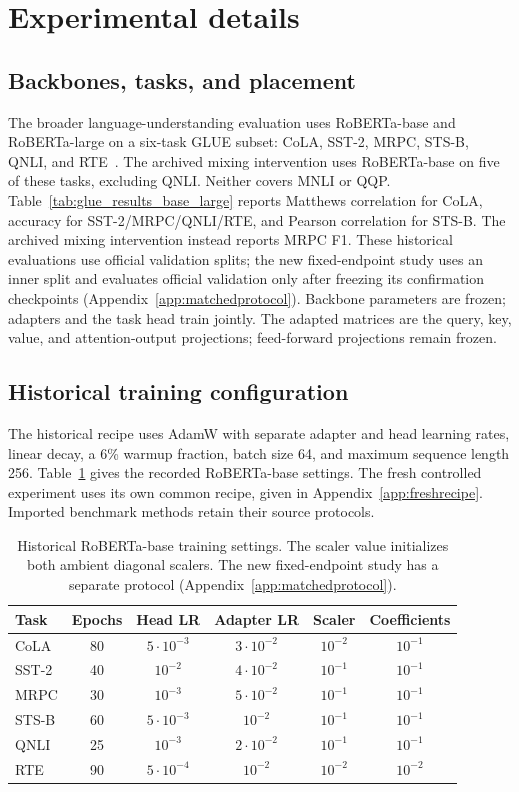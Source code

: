 \documentclass{article}
\begin{document}
\section{Experimental details}
\label{app:details}

\subsection{Backbones, tasks, and placement}
The broader language-understanding evaluation uses RoBERTa-base and RoBERTa-large on a six-task GLUE subset: CoLA, SST-2, MRPC, STS-B, QNLI, and RTE~\citep{wang2018glue}. The archived mixing intervention uses RoBERTa-base on five of these tasks, excluding QNLI. Neither covers MNLI or QQP. Table~\ref{tab:glue_results_base_large} reports Matthews correlation for CoLA, accuracy for SST-2/MRPC/QNLI/RTE, and Pearson correlation for STS-B. The archived mixing intervention instead reports MRPC F1. These historical evaluations use official validation splits; the new fixed-endpoint study uses an inner split and evaluates official validation only after freezing its confirmation checkpoints (Appendix~\ref{app:matchedprotocol}). Backbone parameters are frozen; adapters and the task head train jointly. The adapted matrices are the query, key, value, and attention-output projections; feed-forward projections remain frozen.

\subsection{Historical training configuration}
The historical recipe uses AdamW with separate adapter and head learning rates, linear decay, a 6\% warmup fraction, batch size 64, and maximum sequence length 256. Table~\ref{tab:recipe} gives the recorded RoBERTa-base settings. The fresh controlled experiment uses its own common recipe, given in Appendix~\ref{app:freshrecipe}. Imported benchmark methods retain their source protocols.

\begin{table}[ht]
\centering
\caption{Historical RoBERTa-base training settings. The scaler value initializes both ambient diagonal scalers. The new fixed-endpoint study has a separate protocol (Appendix~\ref{app:matchedprotocol}).}
\label{tab:recipe}
\begin{tabular}{lccccc}
\toprule
Task & Epochs & Head LR & Adapter LR & Scaler & Coefficients\\
\midrule
CoLA & 80 & $5\cdot10^{-3}$ & $3\cdot10^{-2}$ & $10^{-2}$ & $10^{-1}$\\
SST-2 & 40 & $10^{-2}$ & $4\cdot10^{-2}$ & $10^{-1}$ & $10^{-1}$\\
MRPC & 30 & $10^{-3}$ & $5\cdot10^{-2}$ & $10^{-1}$ & $10^{-1}$\\
STS-B & 60 & $5\cdot10^{-3}$ & $10^{-2}$ & $10^{-1}$ & $10^{-1}$\\
QNLI & 25 & $10^{-3}$ & $2\cdot10^{-2}$ & $10^{-1}$ & $10^{-1}$\\
RTE & 90 & $5\cdot10^{-4}$ & $10^{-2}$ & $10^{-2}$ & $10^{-2}$\\
\bottomrule
\end{tabular}
\end{table}
\end{document}
